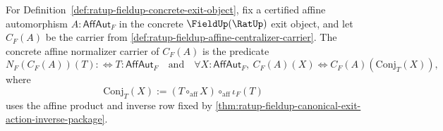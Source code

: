 \begin{definition}
\label{def:ratup-fieldup-affine-centralizer-normalizer-carrier}
For Definition~\ref{def:ratup-fieldup-concrete-exit-object}, fix a certified
affine automorphism $A:\mathsf{AffAut}_F$ in the concrete
$\FieldUp(\RatUp)$ exit object, and let $C_F(A)$ be the carrier from
\autoref{def:ratup-fieldup-affine-centralizer-carrier}. The concrete affine
normalizer carrier of $C_F(A)$ is the predicate
$$
N_F(C_F(A))(T)
:\Longleftrightarrow
T:\mathsf{AffAut}_F
\quad\text{and}\quad
\forall X:\mathsf{AffAut}_F,\ C_F(A)(X)\Longleftrightarrow
C_F(A)(\mathrm{Conj}_T(X)),
$$
where
$$
\mathrm{Conj}_T(X):=(T\circ_{\mathrm{aff}}X)\circ_{\mathrm{aff}}\iota_F(T)
$$
uses the affine product and inverse row fixed by
\autoref{thm:ratup-fieldup-canonical-exit-action-inverse-package}.
\end{definition}

